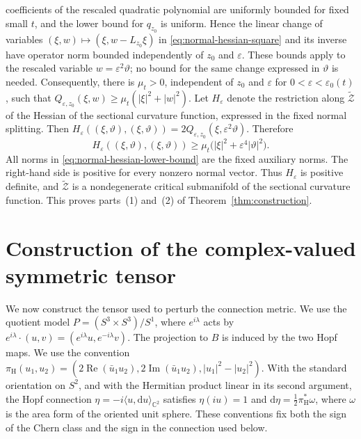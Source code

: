 \documentclass[11pt]{article}
\theoremstyle{definition}
\theoremstyle{remark}
\newcommand{\tZ}{\widetilde{\mathcal Z}}
\newcommand{\dd}{\mathrm d}
\newcommand{\eps}{\varepsilon}
\begin{document}
coefficients of the rescaled quadratic polynomial are uniformly bounded for
fixed small $t$, and the lower bound for $q_{z_0}$ is uniform.  Hence the linear change
of variables $(\xi,w)\mapsto(\xi,w-L_{z_0}\xi)$ in
\eqref{eq:normal-hessian-square} and its inverse have operator norm bounded
independently of $z_0$ and $\eps$.  These bounds apply to the rescaled
variable $w=\eps^2\vartheta$; no bound for the same change expressed in
$\vartheta$ is needed.
Consequently, there is $\mu_t>0$, independent of $z_0$ and $\eps$ for
$0<\eps<\eps_0(t)$, such that
$Q_{\eps,z_0}(\xi,w)\geq \mu_t(|\xi|^2+|w|^2)$.
Let $H_\eps$ denote the restriction along $\tZ$ of the Hessian of the
sectional curvature function, expressed in the fixed normal splitting.  Then
$H_\eps((\xi,\vartheta),(\xi,\vartheta))
=2Q_{\eps,z_0}(\xi,\eps^2\vartheta)$.  Therefore
\begin{equation}                                                                    \label{eq:normal-hessian-lower-bound}
 H_\eps((\xi,\vartheta),(\xi,\vartheta))
 \geq \mu_t\bigl(|\xi|^2+\eps^4|\vartheta|^2\bigr).
\end{equation}
All norms in \eqref{eq:normal-hessian-lower-bound} are the fixed auxiliary norms.
The right-hand side is positive for every nonzero normal vector.  Thus
$H_\eps$ is positive definite, and $\tZ$ is a nondegenerate critical
submanifold of the sectional curvature function.
This proves parts~(1) and~(2) of Theorem~\ref{thm:construction}.

\section{Construction of the complex-valued symmetric tensor}           \label{sec:perturbation-tensor}

We now construct the tensor used to perturb the connection metric.  We use the
quotient model $P=(S^3\times S^3)/S^1$, where $e^{i\lambda}$ acts by
$e^{i\lambda}\cdot(u,v)=(e^{i\lambda}u,e^{-i\lambda}v)$.
The projection to $B$ is induced by the two Hopf maps.  We use the
convention $\pi_{\mathrm H}(u_1,u_2)=
(2\operatorname{Re}(\bar u_1u_2),2\operatorname{Im}(\bar u_1u_2),
|u_1|^2-|u_2|^2)$.
With the standard orientation on $S^2$, and with the Hermitian product
linear in its second argument, the Hopf connection
$\eta=-i\langle u,\dd u\rangle_{\mathbb C^2}$ satisfies
$\eta(iu)=1$ and $\dd\eta=\tfrac12\pi_{\mathrm H}^*\omega$, where
$\omega$ is the area form of the oriented unit sphere.  These conventions
fix both the sign of the Chern class and the sign in the connection used below.
\end{document}
